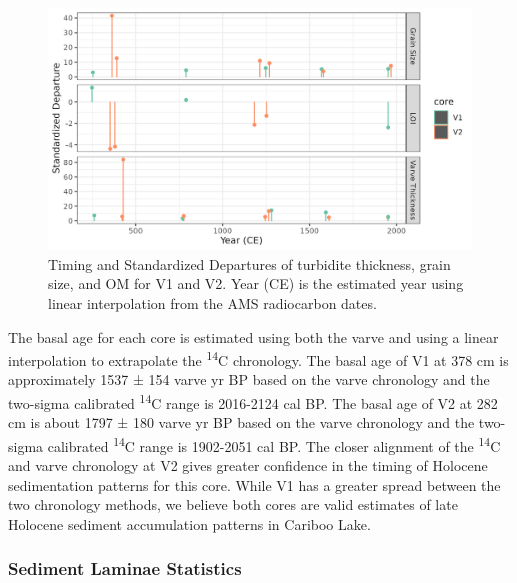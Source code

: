 \documentclass[Royal,times,doublespace,sageh]{sagej}
\begin{document}
\begin{figure}

{\centering \includegraphics[width=1\linewidth]{../figs/turbidite_plot} 

}

\caption{Timing and Standardized Departures of turbidite thickness, grain size, and OM for V1 and V2. Year (CE) is the estimated year using linear interpolation from the AMS radiocarbon dates.\label{turbScatter}}\label{fig:turbScatter}
\end{figure}

The basal age for each core is estimated using both the varve and using
a linear interpolation to extrapolate the \textsuperscript{14}C
chronology. The basal age of V1 at 378 cm is approximately 1537 ± 154
varve yr BP based on the varve chronology and the two-sigma calibrated
\textsuperscript{14}C range is 2016-2124 cal BP. The basal age of V2 at
282 cm is about 1797 ± 180 varve yr BP based on the varve chronology and
the two-sigma calibrated \textsuperscript{14}C range is 1902-2051 cal
BP. The closer alignment of the \textsuperscript{14}C and varve
chronology at V2 gives greater confidence in the timing of Holocene
sedimentation patterns for this core. While V1 has a greater spread
between the two chronology methods, we believe both cores are valid
estimates of late Holocene sediment accumulation patterns in Cariboo
Lake.

\hypertarget{sediment-laminae-statistics}{%
\subsubsection{Sediment Laminae
Statistics}\label{sediment-laminae-statistics}}
\end{document}
